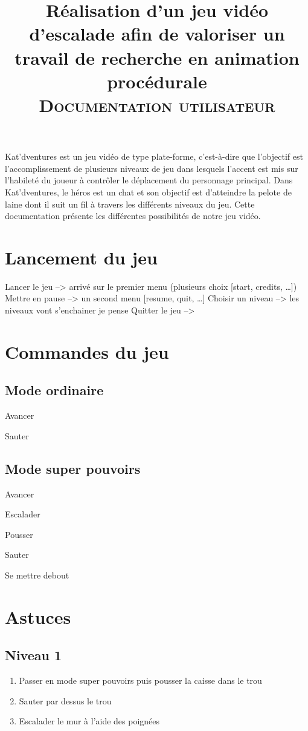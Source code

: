 \documentclass[a4paper,11pt]{article}
\title{ \textbf{Réalisation d'un jeu vidéo d'escalade afin de valoriser un travail de recherche en 
animation procédurale} \\ \textsc{Documentation utilisateur} }
\date{}                    %
\begin{document}
          

\maketitle                 %
\thispagestyle{empty}      %


Kat’dventures est un jeu vidéo de type plate-forme, c’est-à-dire que l’objectif est l’accomplissement de plusieurs niveaux de jeu dans lesquels l'accent est mis sur l'habileté du joueur à contrôler le déplacement du personnage principal. Dans Kat’dventures, le héros est un chat et son objectif est d’atteindre la pelote de laine dont il suit un fil à travers les différents niveaux du jeu.
Cette documentation présente les différentes possibilités de notre jeu vidéo.

\section{Lancement du jeu}
 Lancer le jeu 	--> arrivé sur le premier menu (plusieurs choix [start, credits, …])
Mettre en pause --> un second menu [resume, quit, …]
Choisir un niveau --> les niveaux vont s’enchainer je pense
Quitter le jeu 	-->

\section{Commandes du jeu}
\subsection{Mode ordinaire}
Avancer

Sauter
\subsection{Mode super pouvoirs}
Avancer

Escalader

Pousser

Sauter

Se mettre debout

\section{Astuces}
\subsection{Niveau 1}
\begin{enumerate}
\item Passer en mode super pouvoirs puis pousser la caisse dans le trou
\item Sauter par dessus le trou
\item Escalader le mur à l’aide des poignées
\end{enumerate}
\end{document}
